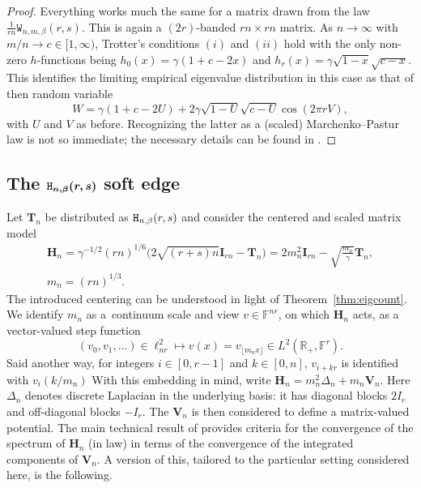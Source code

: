 \documentclass[pdftex]{sigma}
\numberwithin{equation}{section}
\theoremstyle{definition}
\newcommand{\R}{{\mathbb R}}
\newcommand{\mbf}[1]{\mathbf{#1}}
\newcommand{\WW}{\mathtt{W}_{n,m, \beta}}
\begin{document}
\begin{proof}
Everything works much the same for a matrix drawn from the law $ \frac{1}{rn} \WW(r,s)$. This is again a $(2r)$-banded $rn \times rn$ matrix. As $n \rightarrow \infty$ with
$m/n \to c\in [1,\infty)$, Trotter's conditions $(i)$ and $(ii)$ hold with the only non-zero $h$-functions being $h_0(x)=\gamma(1+c-2x)$ and $h_r(x)=\gamma \sqrt{1-x}\sqrt{c-x}$.
This identifies the limiting empirical eigenvalue distribution in this case as that of then random variable
\[
W = \gamma(1+c-2U)+2 \gamma \sqrt{1-U}\sqrt{c-U} \cos(2\pi r V),
\]
with $U$ and $V$ as before. Recognizing the latter as a (scaled) Marchenko--Pastur law is not so immediate; the necessary details can be found in \cite[Proposition~4.2]{Ledoux}.
\end{proof}

\subsection[The H\_n,beta(r,s) soft edge]{The $\boldsymbol{{\tt{H}}_{n,\beta}(r,s)}$ soft edge}

Let $\mbf{T}_n$ be distributed as
${\tt{H}}_{n,\beta}(r,s)$ and consider the
centered and scaled matrix model
\begin{gather}
\mathbf{H}_n = \gamma^{-1/2} (rn)^{1/6} \bigl(2 \sqrt{(r+s)n} \mbf{I}_{rn} - \mathbf{T}_n \bigr)
 = 2 m_n^{2} \mbf{I}_{rn} - \sqrt{\frac{m_n}{{\gamma}}} \mbf{T}_n, \nonumber\\ m_n = (rn)^{1/3}.\label{eq:Hn}
\end{gather}
The introduced centering can be understood in light of Theorem~\ref{thm:eigcount}. We identify $m_n$ as a~continuum scale and view
 $v \in \mathbb{F}^{nr}$, on which $\mathbf{H}_n$ acts, as a vector-valued step function
\begin{equation}
\label{embed}
 (v_0, v_1, \dots) \in \ell_{nr}^2 \mapsto v(x) = v_{\lfloor m_n x \rfloor} \in L^2(\R_+, \mathbb{F}^r).
\end{equation}
Said another way, for integers $i\in [0, r-1] $ and $k \in [0,n]$,
$v_{i + k r}$ is identified with $v_i( k/m_{n})$
With this embedding in mind, write $
 \mathbf{H}_n = m_n^2 \Delta_n + m_n {\mathbf{V}}_n$.
Here $\Delta_n$ denotes discrete Laplacian in the underlying basis: it has diagonal blocks $2{I}_r$ and off-diagonal blocks
$- {I}_r$. The $\mbf{V}_n$ is then considered to define a matrix-valued potential.
The main technical result of
 \cite{Spike2} provides criteria for the convergence of the spectrum of $\mathbf{H}_n$ (in law)
in terms of the convergence of the integrated components of $\mathbf{V}_n$. A version of this, tailored to the particular setting considered here, is the following.
\end{document}
